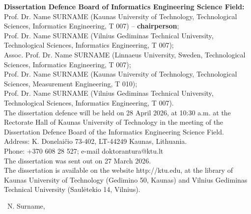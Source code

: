 \begin{titlepage}
\noindent \textbf{Dissertation Defence Board of Informatics Engineering Science Field:}\\
Prof. Dr. Name SURNAME (Kaunas University of Technology, Technological Sciences, Informatics Engineering, T 007) – \textbf{chairperson};\\
Prof. Dr. Name SURNAME (Vilnius Gediminas Technical University, Technological Sciences, Informatics Engineering, T 007);\\
Assoc. Prof. Dr. Name SURNAME (Linnaeus University, Sweden, Technological Sciences, Informatics Engineering, T 007);\\
Prof. Dr. Name SURNAME (Kaunas University of Technology, Technological Sciences, Measurement Engineering, T 010);\\
Prof. Dr. Name SURNAME (Vilnius Gediminas Technical University, Technological Sciences, Informatics Engineering, T 007).\\

\noindent The dissertation defence will be held on 28 April 2026, at 10:30 a.m. at the Rectorate Hall of Kaunas University of Technology in the meeting of the Dissertation Defence Board of the Informatics Engineering Science Field.\\

\noindent Address: K. Donelaičio 73-402, LT-44249 Kaunas, Lithuania.\\ 
Phone: +370 608 28 527; e-mail doktorantura@ktu.lt\\

\noindent The dissertation was sent out on 27 March 2026.\\
The dissertation is available on the website http://ktu.edu, at the library of Kaunas University of Technology (Gedimino 50, Kaunas) and Vilnius Gediminas Technical University (Saulėtekio 14, Vilnius).

   \vfill

   \noindent \textcopyright\ N. Surname, \the\year


\end{titlepage}
